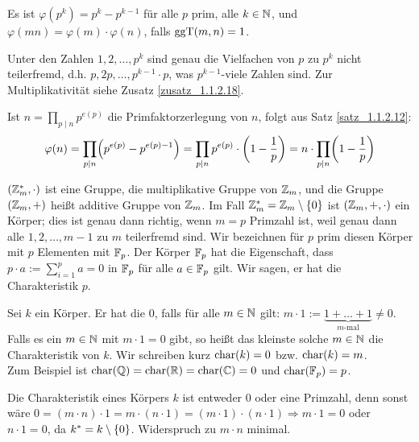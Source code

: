 \begin{satz}
\label{satz_1.1.2.12}
	Es ist $\varphi(p^k) = p^k - p^{k-1}$ für alle $p$ prim, alle $k \in \mathbb{N}$, und $\varphi(mn) = \varphi(m) \cdot \varphi(n)$, falls $\operatorname{ggT}(m,n) = 1$.
\end{satz}

	Unter den Zahlen $1,2, \dots, p^k$ sind genau die Vielfachen von $p$ zu $p^k$ nicht teilerfremd, d.h. $p, 2p, \dots, p^{k-1} \cdot p$, was $p^{k-1}$-viele Zahlen sind. 
	Zur Multiplikativität siehe Zusatz \ref{zusatz_1.1.2.18}.
	
Ist $n = \prod_{p \mid n} p^{e(p)}$ die Primfaktorzerlegung von $n$, folgt aus Satz \ref{satz_1.1.2.12}:
\[ \varphi(n) = \prod_{p \mid n} \enbrace*{p^{e(p)} - p^{e(p)-1}} = \prod_{p \mid n} p^{e(p)} \cdot \enbrace*{1-\frac{1}{p}} = n \cdot \prod_{p \mid n} \enbrace*{1-\frac{1}{p}} \]

\begin{folg}
	$(\mathbb{Z}_m^*,\cdot)$ ist eine Gruppe, die multiplikative Gruppe von $\mathbb{Z}_m$, und die Gruppe $(\mathbb{Z}_m,+)$ heißt additive Gruppe von $\mathbb{Z}_m$. 
	Im Fall $\mathbb{Z}_m^* = \mathbb{Z}_m \setminus \{0\}$ ist $(\mathbb{Z}_m,+,\cdot)$ ein Körper; dies ist genau dann richtig, wenn $m = p$ Primzahl ist, weil genau dann alle $1,2, \dots, m-1$ zu $m$ teilerfremd sind. 
	Wir bezeichnen für $p$ prim diesen Körper mit $p$ Elementen mit $\mathbb{F}_p$. 
	 Der Körper $\mathbb{F}_p$ hat die Eigenschaft, dass $p \cdot a := \sum_{i=1}^{p} a = 0$ in $\mathbb{F}_p$ für alle $a \in \mathbb{F}_p$ gilt. 
	Wir sagen, er hat die Charakteristik $p$.
\end{folg}

\begin{defn}[Charakteristik]
	Sei $k$ ein Körper. 
	Er hat die  $0$, falls für alle $m \in \mathbb{N}$ gilt: $m \cdot 1 := \underbrace{1 + \dots + 1}_{m\text{-mal}} \neq 0$. \\
	Falls es ein $m \in \mathbb{N}$ mit $m \cdot 1 = 0$ gibt, so heißt das kleinste solche $m \in \mathbb{N}$ die Charakteristik von $k$. 
	Wir schreiben kurz $\operatorname{char}(k) = 0$ bzw. $\operatorname{char}(k) = m$. \\
	Zum Beispiel ist $\operatorname{char}(\mathbb{Q}) = \operatorname{char}(\mathbb{R}) = \operatorname{char}(\mathbb{C}) = 0$ und $\operatorname{char}(\mathbb{F}_p) = p$.
\end{defn}

	Die Charakteristik eines Körpers $k$ ist entweder $0$ oder eine Primzahl, denn sonst wäre $0 = (m\cdot n) \cdot 1 = m \cdot (n \cdot 1) = (m \cdot 1) \cdot (n \cdot 1) \Rightarrow m \cdot 1 = 0$ oder $n \cdot 1 = 0$, da $k^* = k \setminus \{0\}$. 
	Widerspruch zu $m\cdot n$ minimal.

